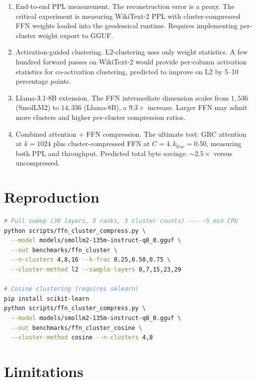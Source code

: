 \documentclass[11pt]{article}
\begin{document}
\begin{enumerate}
\item End-to-end PPL measurement.  The reconstruction error
      is a proxy.  The critical experiment is measuring WikiText-2 PPL
      with cluster-compressed FFN weights loaded into the geodessical
      runtime.  Requires implementing per-cluster weight export to GGUF.

\item Activation-guided clustering.  L2-clustering uses only
      weight statistics.  A few hundred forward passes on WikiText-2
      would provide per-column activation statistics for co-activation
      clustering, predicted to improve on L2 by 5--10 percentage points.

\item Llama-3.1-8B extension.  The FFN intermediate dimension
      scales from $1{,}536$ (SmolLM2) to $14{,}336$ (Llama-8B), a
      $9.3\times$ increase.  Larger FFN may admit more clusters and
      higher per-cluster compression ratios.

\item Combined attention + FFN compression.  The ultimate test:
      GRC attention at $k{=}1024$ plus cluster-compressed FFN at
      $C{=}4,k_\text{frac}{=}0.50$, measuring both PPL and throughput.
      Predicted total byte savings: ${\sim}2.5\times$ versus uncompressed.
\end{enumerate}

\section{Reproduction}
\label{sec:repro}

\begin{lstlisting}[language=bash]
# Full sweep (30 layers, 5 ranks, 3 cluster counts) --- ~5 min CPU
python scripts/ffn_cluster_compress.py \
  --model models/smollm2-135m-instruct-q8_0.gguf \
  --out benchmarks/ffn_cluster \
  --n-clusters 4,8,16 --k-frac 0.25,0.50,0.75 \
  --cluster-method l2 --sample-layers 0,7,15,23,29

# Cosine clustering (requires sklearn)
pip install scikit-learn
python scripts/ffn_cluster_compress.py \
  --model models/smollm2-135m-instruct-q8_0.gguf \
  --out benchmarks/ffn_cluster_cosine \
  --cluster-method cosine --n-clusters 4,8
\end{lstlisting}

\section{Limitations}
\label{sec:limits}
\end{document}
